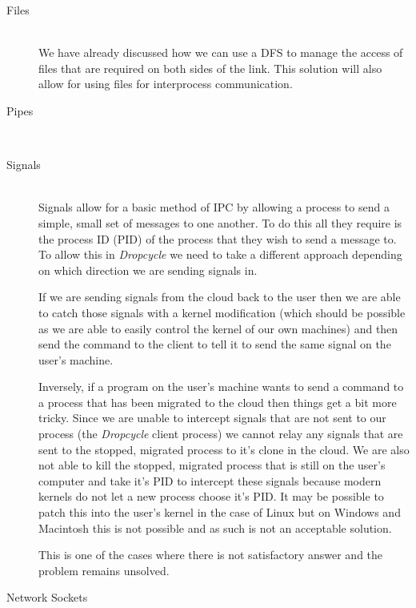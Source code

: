 \documentclass[12pt, a4paper]{article}
\begin{document}
\begin{description}

	\item[Files] \\

	We have already discussed how we can use a DFS to manage the access of
	files that are required on both sides of the link. This solution will
	also allow for using files for interprocess communication.

	\item[Pipes] \\


	\item[Signals] \\

	Signals allow for a basic method of IPC by allowing a process to send
	a simple, small set of messages to one another. To do this all they require
	is the process ID (PID) of the process that they wish to send a message to. To
	allow this in \emph{Dropcycle} we need to take a different approach
	depending on which direction we are sending signals in.

	If we are sending signals from the cloud back to the user then we are able
	to catch those signals with a kernel modification (which should be possible
	as we are able to easily control the kernel of our own machines) and then
	send the command to the client to tell it to send the same signal on the
	user's machine.

	Inversely, if a program on the user's machine wants to send
	a command to a process that has been migrated to the cloud then things get
	a bit more tricky. Since we are unable to intercept signals that are not
	sent to our process (the \emph{Dropcycle} client process) we cannot relay
	any signals that are sent to the stopped, migrated process to it's clone in
	the cloud. We are also not able to kill the stopped, migrated process that
	is still on the user's computer and take it's PID to intercept these
	signals because modern kernels do not let a new process choose it's PID\@. It
	may be possible to patch this into the user's kernel in the case of Linux
	but on Windows and Macintosh this is not possible and as such is not an
	acceptable solution.

	This is one of the cases where there is not satisfactory answer and the problem
	remains unsolved.

	\item[Network Sockets] \\


\end{description}
\end{document}
